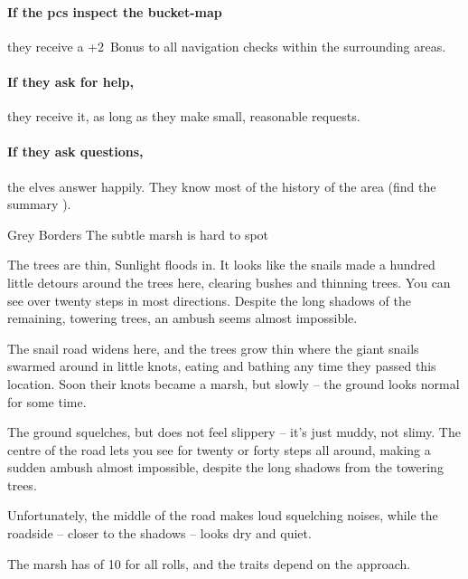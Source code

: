 \paragraph{If the \glspl{pc} inspect the bucket-map}
they receive a +2~Bonus to all \gls{navigation} checks within the surrounding \glspl{area}.

\paragraph{If they ask for help,}
they receive it, as long as they make small, reasonable requests.

\paragraph{If they ask questions,}
the elves answer happily.
They know most of the history of the area (find the summary ).

{Grey Borders}%
{The subtle marsh is hard to spot}%

\begin{boxtext}
  The trees are thin, Sunlight floods in.
  It looks like the snails made a hundred little detours around the trees here, clearing bushes and thinning trees.
  You can see over twenty \glspl{step} in most directions.
  Despite the long shadows of the remaining, towering trees, an ambush seems almost impossible.
\end{boxtext}

The snail road widens here, and the trees grow thin where the giant snails swarmed around in little knots, eating and bathing any time they passed this location.
Soon their knots became a marsh, but slowly -- the ground looks normal for some time.

\begin{boxtext}
  The ground squelches, but does not feel slippery -- it's just muddy, not slimy.
  The centre of the road lets you see for twenty or forty \glspl{step} all around, making a sudden ambush almost impossible, despite the long shadows from the towering trees.

  Unfortunately, the middle of the road makes loud squelching noises, while the roadside -- closer to the shadows -- looks dry and quiet.
\end{boxtext}

The marsh has  of 10 for all rolls, and the \glspl{trait} depend on the approach.

